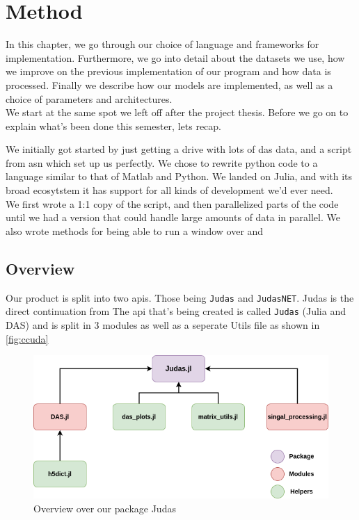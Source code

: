 \chapter{Method}
\label{chap:method}

In this chapter, we go through our choice of language and frameworks for implementation. Furthermore, we go into detail about the datasets we use, how we improve on the previous implementation of our program and how data is processed. Finally we describe how our models are implemented, as well as a choice of parameters and architectures. \\






We start at the same spot we left off after the project thesis. Before we go on to explain what's been done this semester, lets recap. 

We initially got started by just getting a drive with lots of \acrshort{das} data, and a script from \acrfull{asn} which set up us perfectly. We chose to rewrite python code to a language similar to that of Matlab and Python. We landed on Julia, and with its broad ecosytstem it has support for all kinds of development we'd ever need. \\

We first wrote a 1:1 copy of the script, and then parallelized parts of the code until we had a version that could handle large amounts of data in parallel. We also wrote methods for being able to run a window over and \\ 


\section{Overview}

Our product is split into two apis. Those being \texttt{Judas} and \texttt{JudasNET}. Judas is the direct continuation from \cite{projthesis}
The \acrshort{api} that's being created is called \texttt{Judas} (Julia and DAS) and is split in 3 modules as well as a seperate Utils file as shown in \ref{fig:ccuda}

\begin{figure}[h]
    \centering
    \includegraphics[scale=.6]{figures/judas_overview.png}
    \caption{Overview over our package Judas}
    \label{fig:judasoverview}
\end{figure}

